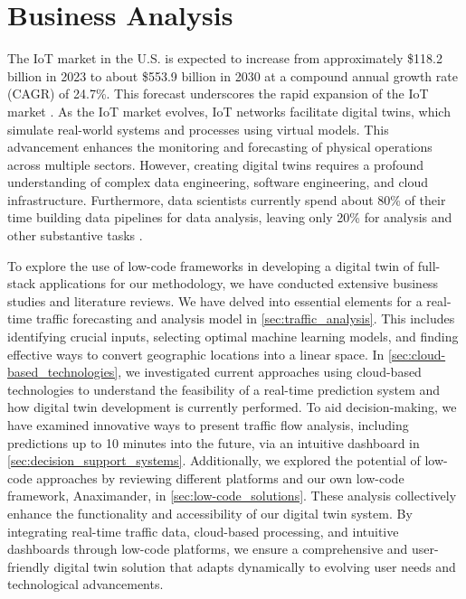 \chapter{Business Analysis}

The IoT market in the U.S. is expected to increase from approximately \$118.2 billion in 2023 to about \$553.9 billion in 2030 at a compound annual growth rate (CAGR) of 24.7\%. This forecast underscores the rapid expansion of the IoT market \cite{fortune2020us}. As the IoT market evolves, IoT networks facilitate digital twins, which simulate real-world systems and processes using virtual models. This advancement enhances the monitoring and forecasting of physical operations across multiple sectors. However, creating digital twins requires a profound understanding of complex data engineering, software engineering, and cloud infrastructure. Furthermore, data scientists currently spend about 80\% of their time building data pipelines for data analysis, leaving only 20\% for analysis and other substantive tasks \cite{trotino2021building}. 

To explore the use of low-code frameworks in developing a digital twin of full-stack applications for our methodology, we have conducted extensive business studies and literature reviews. We have delved into essential elements for a real-time traffic forecasting and analysis model in \autoref{sec:traffic_analysis}. This includes identifying crucial inputs, selecting optimal machine learning models, and finding effective ways to convert geographic locations into a linear space. In \autoref{sec:cloud-based_technologies}, we investigated current approaches using cloud-based technologies to understand the feasibility of a real-time prediction system and how digital twin development is currently performed. To aid decision-making, we have examined innovative ways to present traffic flow analysis, including predictions up to 10 minutes into the future, via an intuitive dashboard in \autoref{sec:decision_support_systems}. Additionally, we explored the potential of low-code approaches by reviewing different platforms and our own low-code framework, Anaximander, in \autoref{sec:low-code_solutions}. These analysis collectively enhance the functionality and accessibility of our digital twin system. By integrating real-time traffic data, cloud-based processing, and intuitive dashboards through low-code platforms, we ensure a comprehensive and user-friendly digital twin solution that adapts dynamically to evolving user needs and technological advancements.

